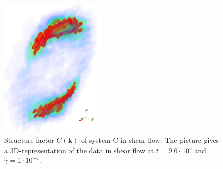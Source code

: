 \documentclass[8.5pt,twoside,twocolumn]{article}
\newcommand{\e}[1]{\cdot10^{#1}}
\begin{document}
\begin{figure}[!]
\centering
\includegraphics[angle=0,width=0.45\textwidth]{ck_run788_960_zoom.jpg}
\caption{Structure factor $C({\mathbf k})$ of system C in shear flow: The picture gives a 3D-representation of the data in shear flow at $t=9.6\e{5}$ and $\dot{\gamma}=1\cdot10^{-4}$.}
\label{fig15}
\end{figure}
\end{document}
